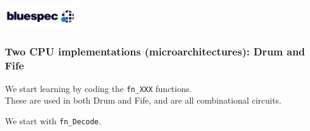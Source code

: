 



\date{L4: {\BSV}: Combinational Circuits}


\renewcommand{\PAUSE}[1]{#1}





\begin{frame}
 \titlepage

 \begin{center}
  \includegraphics[height=1cm]{../Figures/Bluespec_Logo_2022-10}
 \end{center}

\end{frame}


\begin{frame}
\frametitle{Two CPU implementations (microarchitectures): Drum and Fife}

\begin{center}
\end{center}

\footnotesize

We start learning {\BSV} by coding the {\tt fn\_XXX} functions.  \\
These are used in both Drum and Fife, and are all combinational circuits.

\vspace*{1ex}

We start with {\tt fn\_Decode}.

\end{frame}

